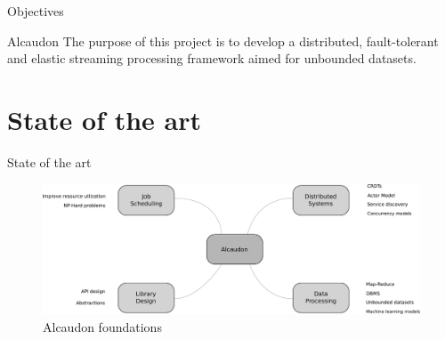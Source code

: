 \documentclass[10pt]{beamer}
\begin{document}
\begin{frame}{Objectives}

  \begin{block}{Alcaudon}
    The purpose of this project is to develop a distributed, fault-tolerant and
    elastic streaming processing framework aimed for unbounded datasets.
  \end{block}
\end{frame}



\section{State of the art}

\begin{frame}{State of the art}
\begin{figure}[!h]
\begin{center}
\includegraphics[width=1\textwidth]{../figures/mindmap.pdf}
\caption{Alcaudon foundations}
\label{fig:mindmap}
\end{center}
\end{figure}
  \end{frame}
\end{document}
